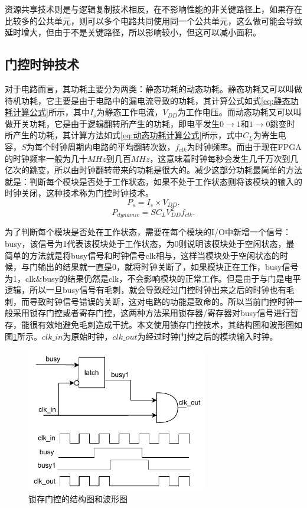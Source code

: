   资源共享技术则是与逻辑复制技术相反，在不影响性能的非关键路径上，如果存在比较多的公共单元，则可以多个电路共同使用同一个公共单元，这么做可能会导致延时增大，但由于不是关键路径，所以影响较小，但这可以减小面积。

\subsection{门控时钟技术}
对于电路而言，其功耗主要分为两类：静态功耗的动态功耗。静态功耗又可以叫做待机功耗，它主要是由于电路中的漏电流导致的功耗，其计算公式如式\eqref{eq:静态功耗计算公式}所示，其中$I_s$为静态工作电流，$V_{DD}$为工作电压。而动态功耗又可以叫做开关功耗，它是由于逻辑翻转所产生的功耗，即电平发生$0\rightarrow1$和$1\rightarrow0$跳变时所产生的功耗，其计算方法如式\eqref{eq:动态功耗计算公式}所示，式中$C_L$为寄生电容，$S$为每个时钟周期内电路的平均翻转次数，$f_{clk}$为时钟频率。而由于现在FPGA的时钟频率一般为几十$MHz$到几百$MHz$，这意味着时钟每秒会发生几千万次到几亿次的跳变，所以由时钟翻转带来的功耗是很大的。减少这部分功耗最简单的方法就是：判断每个模块是否处于工作状态，如果不处于工作状态则将该模块的输入的时钟关闭，这种技术称为门控时钟技术。
\begin{equation}\label{eq:静态功耗计算公式}
    P_s = I_s \times V_{DD}.
    \end{equation}
\begin{equation}\label{eq:动态功耗计算公式}
    P_{dynamic}=SC_LV^2_{DD}f_{clk}.
    \end{equation}


为了判断每个模块是否处在工作状态，需要在每个模块的I/O中新增一个信号：busy，该信号为1代表该模块处于工作状态，为0则说明该模块处于空闲状态，最简单的方法就是将busy信号和时钟信号clk相与，这样当模块处于空闲状态的时候，与门输出的结果就一直是0，就将时钟关断了，如果模块正在工作，busy信号为1，clk$\&$busy的结果仍然是clk，不会影响模块的正常工作。但是由于与门是电平逻辑，所以一旦busy信号有毛刺，就会导致经过门控时钟出来之后的时钟也有毛刺，而导致时钟信号错误的关断，这对电路的功能是致命的。所以当前门控时钟一般采用锁存门控或者寄存门控，这两种方法采用锁存器/寄存器对busy信号进行暂存，能很有效地避免毛刺造成干扰。本文使用锁存门控技术，其结构图和波形图如图\ref{fig:锁存门控的结构图和波形图}所示。$clk\_in$为原始时钟，$clk\_out$为经过时钟门控之后的模块输入时钟。
\begin{figure}[htb]
    \centering
    \includegraphics[width=8cm]{fig/5-fig/锁存门控的结构图和波形图.drawio.pdf}
    \caption{锁存门控的结构图和波形图}
    \label{fig:锁存门控的结构图和波形图}
\end{figure}

